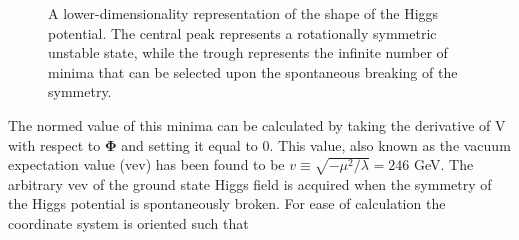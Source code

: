 \begin{figure}[!h]
  \begin{center}
    \caption{ A lower-dimensionality representation of the shape of the Higgs
potential.  The central peak represents a rotationally symmetric
unstable state, while the trough represents the infinite number of minima that
can be selected upon the spontaneous breaking of the symmetry.}
    \label{fig:higgs_potential}
  \end{center}
\end{figure}

The normed value of this minima can be calculated by taking the derivative of V
with respect to $\boldsymbol{\Phi}$ and setting it equal to $0$. This value,
also known as the vacuum expectation value (vev) has been found to be $v \equiv
\sqrt{-\mu^{2}/\lambda} = 246$ GeV. The arbitrary vev of the ground state Higgs
field is acquired when the symmetry of the Higgs potential is spontaneously
broken.  For ease of calculation the coordinate system is oriented such that

